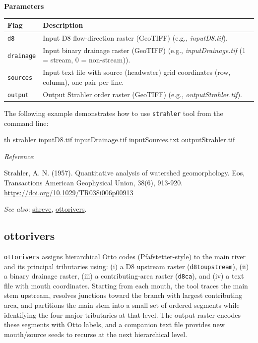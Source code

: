 \documentclass[
]{book}
\newenvironment{Shaded}{\begin{snugshade}}{\end{snugshade}}
\newcommand{\ExtensionTok}[1]{#1}
\newcommand{\NormalTok}[1]{#1}
\begin{document}
\textbf{Parameters}

\begin{longtable}[]{@{}
  >{\raggedright\arraybackslash}p{}
  >{\raggedright\arraybackslash}p{}@{}}
\toprule\noalign{}
\begin{minipage}[b]{\linewidth}\raggedright
Flag
\end{minipage} & \begin{minipage}[b]{\linewidth}\raggedright
Description
\end{minipage} \\
\midrule\noalign{}
\endhead
\bottomrule\noalign{}
\endlastfoot
\texttt{d8} & Input D8 flow-direction raster (GeoTIFF) (e.g., \emph{inputD8.tif}). \\
\texttt{drainage} & Input binary drainage raster (GeoTIFF) (e.g., \emph{inputDrainage.tif} (1 = stream, 0 = non-stream)). \\
\texttt{sources} & Input text file with source (headwater) grid coordinates (row, column), one pair per line. \\
\texttt{output} & Output Strahler order raster (GeoTIFF) (e.g., \emph{outputStrahler.tif}). \\
\end{longtable}

The following example demonstrates how to use \texttt{strahler} tool from the command line:

\begin{Shaded}
\begin{Highlighting}[]
\ExtensionTok{th}\NormalTok{ strahler inputD8.tif inputDrainage.tif inputSources.txt outputStrahler.tif}
\end{Highlighting}
\end{Shaded}

\emph{Reference}:

Strahler, A. N. (1957). Quantitative analysis of watershed geomorphology. Eos, Transactions American Geophysical Union, 38(6), 913-920. \url{https://doi.org/10.1029/TR038i006p00913}

\emph{See also}: \hyperref[shreve]{shreve}, \hyperref[ottorivers]{ottorivers}.

\subsection{ottorivers}\label{ottorivers}

\texttt{ottorivers} assigns hierarchical Otto codes (Pfafstetter-style) to the main river and its principal tributaries using: (i) a D8 upstream raster (\texttt{d8toupstream}), (ii) a binary drainage raster, (iii) a contributing-area raster (\texttt{d8ca}), and (iv) a text file with mouth coordinates. Starting from each mouth, the tool traces the main stem upstream, resolves junctions toward the branch with largest contributing area, and partitions the main stem into a small set of ordered segments while identifying the four major tributaries at that level. The output raster encodes these segments with Otto labels, and a companion text file provides new mouth/source seeds to recurse at the next hierarchical level.
\end{document}
